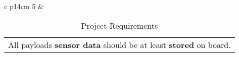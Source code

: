 \begin{table}[htb]
\begin{tabular}{c p{14cm}}
		5                & \begin{tabular}[c]{@{}l@{}}\begin{minipage}[t]{\linewidth}
				All payloads \textbf{sensor data} should be at least \textbf{stored} on board.
		\end{minipage}\end{tabular}\vspace{0.3cm}                                                                                                     \\
		                                                                                                     \\ \bottomrule
	\end{tabular}
	\caption{Project Requirements}
\end{table}
